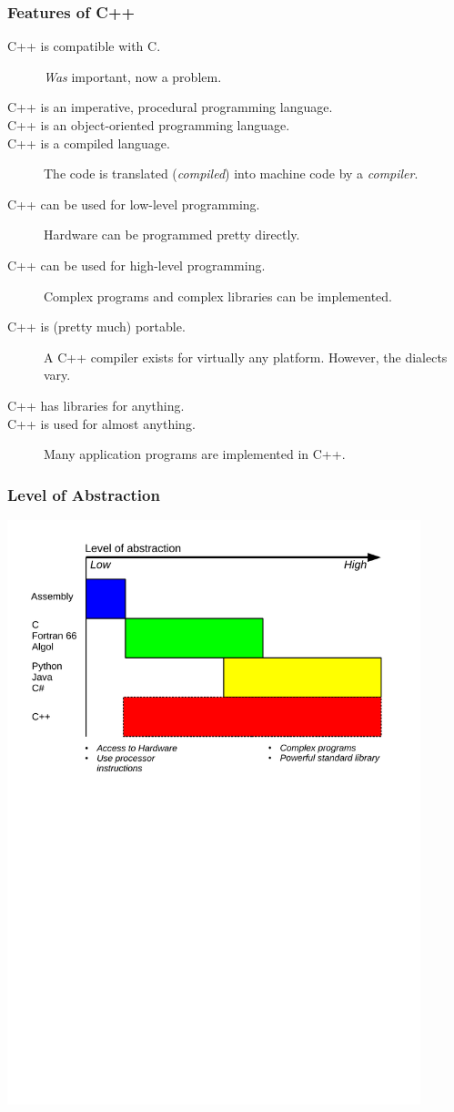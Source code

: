 \documentclass{slides}
\begin{document}
\begin{frame}
  \frametitle{Features of C++}
  \begin{description}
  \item[C++ is compatible with C.] \emph{Was} important, now a problem.
  \item[C++ is an imperative, procedural programming language.]
  \item[C++ is an object-oriented programming language.]
  \item[C++ is a compiled language.] The code is translated
    (\textit{compiled}) into machine code by a \textit{compiler}.
  \item[C++ can be used for low-level programming.] Hardware can be
    programmed pretty directly.
  \item[C++ can be used for high-level programming.] Complex
    programs and complex libraries can be implemented.
  \item[C++ is (pretty much) portable.] A C++ compiler exists for
    virtually any platform. However, the dialects vary.
  \item[C++ has libraries for anything.] 
  \item[C++ is used for almost anything.] Many application programs
    are implemented in C++.
  \end{description}
\end{frame}

\begin{frame}
  \frametitle{Level of Abstraction}
  \centering
  \includegraphics[width=0.9\textwidth]{languages}
\end{frame}
\end{document}
